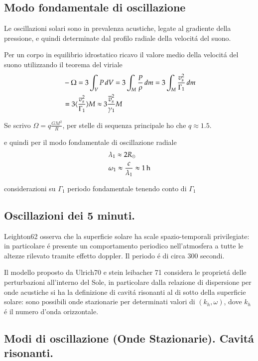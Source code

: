 \documentclass[oneside,12pt,fleqn]{memoir}
\begin{document}
\subsection{Modo fondamentale di oscillazione}

Le oscillazioni solari sono in prevalenza acustiche, legate al gradiente della pressione, e quindi determinate dal profilo radiale della velocit\'a del suono.


Per un corpo in equilibrio idrostatico ricavo il valore medio della velocit\'a del suono utilizzando il teorema del viriale
\begin{align*}
    &-\Omega=3\int_VP\,dV=3\int_M\frac{P}{\rho}\,dm=3\int_M\frac{v_s^2}{\Gamma_1}\,dm\\
    &=3\langle \frac{v_s^2}{\Gamma_1} \rangle M\approx3\frac{\overline{v}_s^2}{\gamma_1}M
\end{align*}

Se scrivo $\Omega=q\frac{GM^2}{R}$, per stelle di sequenza principale ho che $q\approx1.5$.

e quindi per il modo fondamentale di oscillazione radiale
\begin{align*}
    &\lambda_1\approx 2R_{\odot}{}\\
    &\omega_1\approx\frac{c}{\lambda_1}\approx\SI{1}{\hour}
\end{align*}

\begin{todo}{considerazioni su $\Gamma_1$}
periodo fondamentale tenendo conto di $\Gamma_1$ 
\end{todo}

\subsection{Oscillazioni dei 5 minuti.}

Leighton62 osserva che la superficie solare ha scale spazio-temporali privilegiate: in particolare \'e presente un comportamento periodico nell'atmosfera a tutte le altezze rilevato tramite effetto doppler. Il periodo \'e di circa 300 secondi.

Il modello proposto da Ulrich70 e stein leibacher 71 considera le propriet\'a delle perturbazioni all'interno del Sole, in particolare dalla relazione di dispersione per onde acustiche si ha la definizione di cavit\'a risonanti al di sotto della superficie solare: sono possibili onde stazionarie per determinati valori di  $(k_h,\omega)$, dove $k_h$ \'e il numero d'onda orizzontale.

\subsection{Modi di oscillazione (Onde Stazionarie). Cavit\'a risonanti.}
\end{document}
